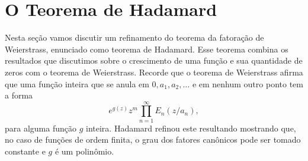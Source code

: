     \section{O Teorema de Hadamard}
    Nesta seção vamos discutir um refinamento do teorema da fatoração de Weierstrass,
    enunciado como teorema de Hadamard. Esse teorema combina os resultados que discutimos
    sobre o crescimento de uma função e sua quantidade de zeros com o teorema de
    Weierstrass. Recorde que o teorema de Weierstrass afirma que uma função inteira
    que se anula em $0, a_1, a_2, \dots$ e em nenhum outro ponto tem a forma
    \[
        e^{g(z)}z^m\prod_{n=1}^{\infty} E_n(z/a_n),
    \]
    para alguma função $g$ inteira.
    Hadamard refinou este resultando mostrando que, no caso de funções de ordem finita,
    o grau dos fatores canônicos pode ser tomado constante e $g$ é um polinômio.
    
